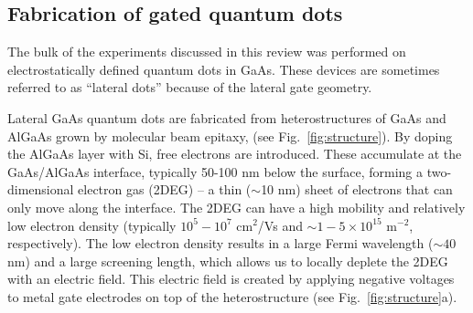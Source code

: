 \documentclass[12pt,aps,nofootinbib]{revtex4-1}
\begin{document}
\subsection{Fabrication of gated quantum dots}
\label{Sec:Fabrication}
The bulk of the experiments discussed in this review was performed
on electrostatically defined quantum dots in GaAs. These devices
are sometimes referred to as ``lateral dots'' because of the
lateral gate geometry.

Lateral GaAs quantum dots are fabricated from heterostructures of
GaAs and AlGaAs grown by molecular beam epitaxy, (see
Fig.~\ref{fig:structure}). By doping the AlGaAs layer with Si,
free electrons are introduced. These accumulate at the GaAs/AlGaAs
interface, typically 50-100 nm below the surface, forming a
two-dimensional electron gas (2DEG) -- a thin ($\sim$10 nm) sheet
of electrons that can only move along the interface. The 2DEG can
have a high mobility and relatively low electron density
(typically $10^5-10^7$ cm$^2$/Vs and $\sim 1-5\times 10^{15}$
m$^{-2}$, respectively). The low electron density results in a
large Fermi wavelength ($\sim 40$ nm) and a large screening
length, which allows us to locally deplete the 2DEG with an
electric field. This electric field is created by applying
negative voltages to metal gate electrodes on top of the
heterostructure (see Fig.~\ref{fig:structure}a).
\end{document}
